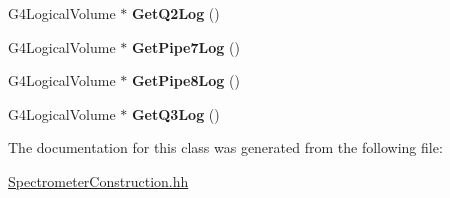 \begin{DoxyCompactItemize}
\item 
\hypertarget{classSpectrometerConstruction_ae72330343c76b6226e32f6b22e6d3808}{G4\-Logical\-Volume $\ast$ {\bfseries Get\-Q2\-Log} ()}\label{classSpectrometerConstruction_ae72330343c76b6226e32f6b22e6d3808}

\item 
\hypertarget{classSpectrometerConstruction_a5faa9072e9668f52b02f84939253a8c3}{G4\-Logical\-Volume $\ast$ {\bfseries Get\-Pipe7\-Log} ()}\label{classSpectrometerConstruction_a5faa9072e9668f52b02f84939253a8c3}

\item 
\hypertarget{classSpectrometerConstruction_a12a39b746bcae5a3430b9cb9263182a2}{G4\-Logical\-Volume $\ast$ {\bfseries Get\-Pipe8\-Log} ()}\label{classSpectrometerConstruction_a12a39b746bcae5a3430b9cb9263182a2}

\item 
\hypertarget{classSpectrometerConstruction_a1bb912fd72f100e04e0d85084cfd32e5}{G4\-Logical\-Volume $\ast$ {\bfseries Get\-Q3\-Log} ()}\label{classSpectrometerConstruction_a1bb912fd72f100e04e0d85084cfd32e5}

\end{DoxyCompactItemize}


The documentation for this class was generated from the following file\-:\begin{DoxyCompactItemize}
\item 
\hyperlink{SpectrometerConstruction_8hh}{Spectrometer\-Construction.\-hh}\end{DoxyCompactItemize}
